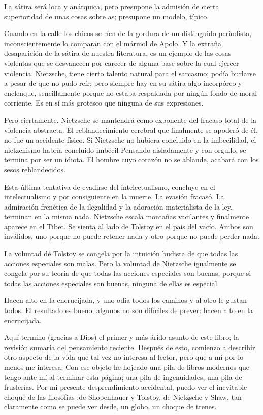 La sátira será loca y anárquica, pero presupone la admisión de cierta superioridad de unas cosas
sobre as; presupone un modelo, típico.

Cuando en la calle los chicos se ríen de la gordura de un distinguido periodista, inconscientemente
lo comparan con el mármol de Apolo. Y la extraña desaparición de la sátira de nuestra literatura, es un
ejemplo de las cosas violentas que se desvanecen por carecer de alguna base sobre la cual ejercer
violencia. Nietzsche, tiene cierto talento natural para el sarcasmo; podía burlarse a pesar de que no pudo
reír; pero siempre hay en su sátira algo incorpóreo y enclenque, sencillamente porque no estaba
respaldada por ningún fondo de moral corriente. Es en sí más grotesco que ninguna de sus expresiones.

Pero ciertamente, Nietzsche se mantendrá como exponente del fracaso total de la violencia abstracta. El
reblandecimiento cerebral que finalmente se apoderó de él, no fue un accidente físico. Si Nietzsche no
hubiera concluido en la imbecilidad, el nietzchismo habría concluido imbécil Pensando aisladamente y
con orgullo, se termina por ser un idiota. El hombre cuyo corazón no se ablande, acabará con los sesos
reblandecidos.

Esta última tentativa de evadirse del intelectualismo, concluye en el intelectualismo y por
consiguiente en la muerte. La evasión fracasó. La admiración frenética de la ilegalidad y la adoración
materialista de la ley, terminan en la misma nada. Nietzsche escala montañas vacilantes y finalmente
aparece en el Tibet. Se sienta al lado de Tolstoy en el país del vacío. Ambos son inválidos, uno porque no
puede retener nada y otro porque no puede perder nada.

La voluntad dé Tolstoy se congela por la intuición budista de que todas las acciones especiales son
malas. Pero la voluntad de Nietzsche igualmente se congela por su teoría de que todas las acciones
especiales son buenas, porque si todas las acciones especiales son buenas, ninguna de ellas es especial.

Hacen alto en la encrucijada, y uno odia todos los caminos y al otro le gustan todos. El resultado es
bueno; algunos no son difíciles de prever: hacen alto en la encrucijada.

Aquí termino (gracias a Dios) el primer y más árido asunto de este libro; la revisión sumaria del
pensamiento reciente. Después de esto, comienzo a describir otro aspecto de la vida que tal vez no
interesa al lector, pero que a mí por lo menos me interesa. Con ese objeto he hojeado una pila de libros
modernos que tengo ante mí al terminar esta página; una pila de ingenuidades, una pila de fruslerías. Por
mi presente desprendimiento accidental, puedo ver el inevitable choque de las filosofías .de Shopenhauer
y Tolstoy, de Nietzsche y Shaw, tan claramente como se puede ver desde, un globo, un choque de trenes.

